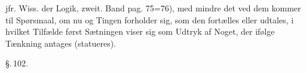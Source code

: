 \documentclass[12pt]{book}
\def\textit#1{#1}%
\newcommand{\parag}[1]{%
  \par\vspace{0.9\baselineskip}%
  {\centering\textit{\S.\,#1.}\par}%
  \vspace{0.35\baselineskip}%
  \noindent\hspace{\parindent}\ignorespaces
}
\newcommand{\opage}[1]{\marginnote{\footnotesize\textit{[#1]}}}
\begin{document}
jfr. Wiss. der Logik, zweit. Band pag.
\opage{249} 75=76), med mindre det ved dem kommer til Spørsmaal, om nu og Tingen forholder sig,
som den fortælles eller udtales, i hvilket Tilfælde først Sætningen viser sig som
Udtryk af Noget, der ifølge Tænkning antages (statueres).

\parag{102}
\end{document}
